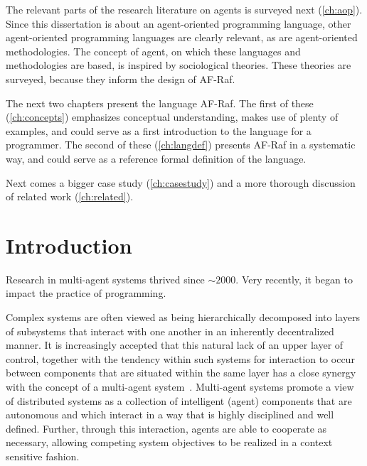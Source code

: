 \documentclass[a4paper,12pt,oneside,fleqn]{book} %
\newcommand{\rg}[1]{\marginpar{\tiny\raggedright\textcolor{blue}{\bf rg:} #1}}
\begin{document}
The relevant parts of the research literature on agents is surveyed next
(\autoref{ch:aop}). Since this dissertation is about an agent-oriented
programming language, other agent-oriented programming languages are
clearly relevant, as are agent-oriented methodologies. The concept of
agent, on which these languages and methodologies are based, is inspired by
sociological theories. These theories are surveyed, because they inform the
design of AF-Raf.

The next two chapters present the language AF-Raf. The first of these
(\autoref{ch:concepts}) emphasizes conceptual understanding, makes use of
plenty of examples, and could serve as a first introduction to the language
for a programmer. The second of these (\autoref{ch:langdef}) presents
AF-Raf in a systematic way, and could serve as a reference formal
definition of the language.

Next comes a bigger case study (\autoref{ch:casestudy}) and a more thorough
discussion of related work (\autoref{ch:related}).


\chapter{Introduction}\label{ch:intro} %

Research in multi-agent systems thrived since $\sim2000$.
Very recently, it began to impact the practice of programming.

Complex systems are often viewed as being hierarchically decomposed into layers
of subsystems that interact with one another in an inherently decentralized
manner. It is increasingly accepted that this natural lack of an upper layer of
control, together with the tendency within such systems for interaction to
occur between components that are situated within the same layer has a close
synergy with the concept of a multi-agent
system~\cite{Jennings00agent-orientedsoftware}. Multi-agent systems promote a
view of distributed systems as a collection of intelligent (agent) components
that are autonomous and which interact in a way that is highly disciplined and
well defined. Further, through this interaction, agents are able to cooperate
as necessary, allowing competing system objectives to be realized in a context
sensitive fashion.
\end{document}
